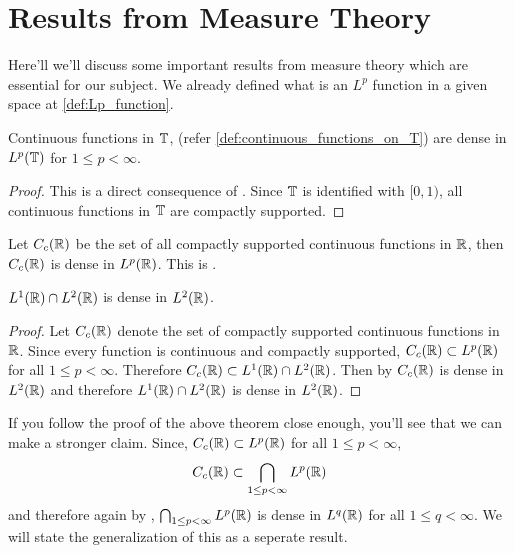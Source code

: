
\chapter{Results from Measure Theory}
Here'll we'll discuss some important results from measure theory which are essential for our subject. We already defined what is an $L^p$ function in a given space at \autoref{def:Lp_function}.

\begin{proposition}
  \label{prop:continuous_functions_in_T_are_dense_in_L1}
  Continuous functions in $\mathbb T$, (refer \autoref{def:continuous_functions_on_T}) are dense in $L^p(\mathbb T)$ for $1\le p < \infty$.
\end{proposition}
\begin{proof}
  This is a direct consequence of \autocite[Theorem~3.14 on \pno~69]{papaRudin}. Since $\mathbb T$ is identified with $[0, 1)$, all continuous functions in $\mathbb T$ are compactly supported.
\end{proof}

\begin{proposition}
\label{prop:compact_supported_cont_func_are_dense_in_Lp}
  Let $C_c(\mathbb R)$ be the set of all compactly supported continuous functions in $\mathbb R$, then $C_c(\mathbb R)$ is dense in $L^p(\mathbb R)$. This is \autocite[Theorem~3.14 \pno~69]{papaRudin}.
\end{proposition}


\begin{proposition}
  \label{prop:L1_functions_are_dense_in_L2}
  $L^1(\mathbb R) \cap L^2(\mathbb R)$ is dense in $L^2(\mathbb R)$.
\end{proposition}
\begin{proof}
  Let $C_c(\mathbb R)$ denote the set of compactly supported continuous functions in $\mathbb R$. Since every function is continuous and compactly supported, $C_c(\mathbb R) \subset L^p(\mathbb R)$ for all $1\le p < \infty$. Therefore $C_c(\mathbb R) \subset L^1(\mathbb R) \cap L^2(\mathbb R)$. Then by \autocite[Theorem~3.14 on \pno~69]{papaRudin} $C_c(\mathbb R)$ is dense in $L^2(\mathbb R)$ and therefore $L^1(\mathbb R) \cap L^2(\mathbb R)$ is dense in $L^2(\mathbb R)$.
\end{proof}

If you follow the proof of the above theorem close enough, you'll see that we can make a stronger claim. Since, $C_c(\mathbb R) \subset L^p(\mathbb R)$ for all $1\le p < \infty$, $$C_c(\mathbb R) \subset \bigcap_{1\le p < \infty} L^p(\mathbb R)$$
and therefore again by \autocite[Theorem~3.14 on \pno~69]{papaRudin}, $\bigcap_{1\le p < \infty} L^p(\mathbb R)$ is dense in $L^q(\mathbb R)$ for all $1 \le q < \infty$. We will state the generalization of this as a seperate result.

